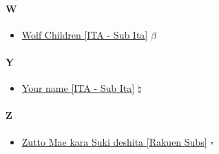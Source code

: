 		 \paragraph{W} \hypertarget{FW}{}
			\begin{itemize}
				
				\item \href{https://mega.nz/#!7wJGnagT!R50hS8GO08F1WomihtT0R2lToH-DMs9ndMitKEG0Qz4} {Wolf Children [ITA - Sub Ita]} $\beta$   \\
			
			\end{itemize}
		
		 \paragraph{Y} \hypertarget{FY}{}
			\begin{itemize}
				
				\item \href{https://mega.nz/#!tu4mwbrb!i7-GjZIYVdh8bHUN96g9uKGrLyro-MoXffL9SSS2DPA} {Your name [ITA - Sub Ita]} $\natural$   \\
				
			\end{itemize}
		
		\paragraph{Z} \hypertarget{FY}{}
			\begin{itemize}
				
				\item \href{https://mega.nz/#!jwkjgLaR!HQ2WYRUpcvEZJjoFOmqmSWRLYZIMLetYdNqgzGuZfoM} {Zutto Mae kara Suki deshita [Rakuen Subs]} $\square$   \\
				
			\end{itemize}
			
			
